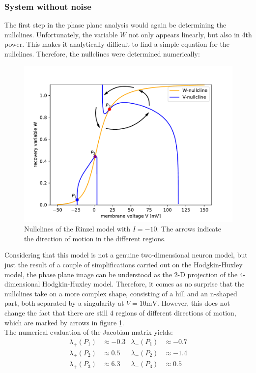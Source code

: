 \documentclass[12pt,a4paper]{article}
\begin{document}
\subsubsection{System without noise}
The first step in the phase plane analysis would again be determining the nullclines. Unfortunately, the variable $W$ not only appears linearly, but also in 4th power. This makes it analytically difficult to find a simple equation for the nullclines. Therefore, the nullclines were determined numerically:
\begin{figure}[H]
	\centering
	\includegraphics[scale=0.95]{rinzelclinesarrowwp.pdf}\caption{Nullclines of the Rinzel model with $I=-10$. The arrows indicate the direction of motion in the different regions.}
	\label{rinzelnc}
\end{figure}
Considering that this model is not a genuine two-dimensional neuron model, but just the result of a couple of simplifications carried out on the Hodgkin-Huxley model, the phase plane image can be understood as the 2-D projection of the 4-dimensional Hodgkin-Huxley model. Therefore, it comes as no surprise that the nullclines take on a more complex shape, consisting of a hill and an n-shaped part, both separated by a singularity at $V=10\text{mV}$. However, this does not change the fact that there are still 4 regions of different directions of motion, which are marked by arrows in figure \ref{rinzelnc}. \\
The numerical evaluation of the Jacobian matrix yields:
\begin{align*}
\lambda_+(P_1)&\approx-0.3 & \lambda_-(P_1)&\approx-0.7\\
\lambda_+(P_2)&\approx 0.5& \lambda_-(P_2)&\approx -1.4\\
\lambda_+(P_3)&\approx 6.3& \lambda_-(P_3)&\approx 0.5
\end{align*}
\end{document}
